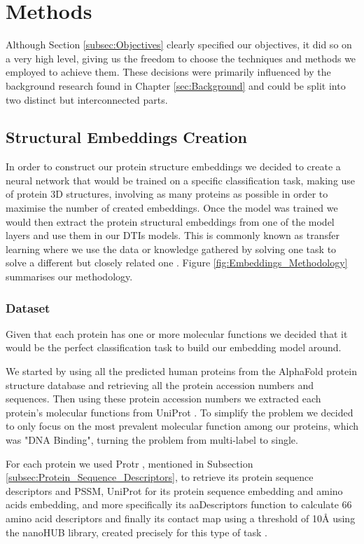 \section{Methods}
\label{sec:Methods}

Although Section \ref{subsec:Objectives} clearly specified our objectives, it did so on a very high level, giving us the freedom to choose the techniques and methods we employed to achieve them. These decisions were primarily influenced by the background research found in Chapter \ref{sec:Background} and could be split into two distinct but interconnected parts.

\subsection{Structural Embeddings Creation}

In order to construct our protein structure embeddings we decided to create a neural network that would be trained on a specific classification task, making use of protein 3D structures, involving as many proteins as possible in order to maximise the number of created embeddings. Once the model was trained we would then extract the protein structural embeddings from one of the model layers and use them in our DTIs models. This is commonly known as transfer learning where we use the data or knowledge gathered by solving one task to solve a different but closely related one \citep{Zhuang2019}. Figure \ref{fig:Embeddings_Methodology} summarises our methodology.

\subsubsection{Dataset}

Given that each protein has one or more molecular functions we decided that it would be the perfect classification task to build our embedding model around. 

We started by using all the predicted human proteins from the AlphaFold protein structure database \citep{Jumper2021, Varadi2022} and retrieving all the protein accession numbers and sequences. Then using these protein accession numbers we extracted each protein's molecular functions from UniProt \citep{UniProt_Paper}. To simplify the problem we decided to only focus on the most prevalent molecular function among our proteins, which was "DNA Binding", turning the problem from multi-label to single.

For each protein we used Protr \citep{ProtR_Paper}, mentioned in Subsection \ref{subsec:Protein_Sequence_Descriptors}, to retrieve its protein sequence descriptors and PSSM, UniProt \citep{UniProt_Paper} for its protein sequence embedding and amino acids embedding, \citet{Peptides} and more specifically its aaDescriptors function to calculate 66 amino acid descriptors and finally its contact map using a threshold of 10\AA {} using the nanoHUB library, created precisely for this type of task \citep{nanoHUB_Library}.

